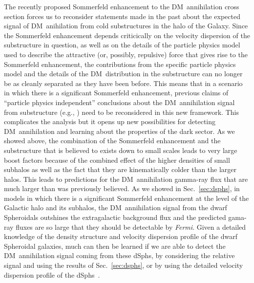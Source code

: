 \documentclass[aps,prd,twocolumn,amsmath,amssymb,floatfix,nofootinbib,10pt]{revtex4}
\newcommand{\eg}{e.g.}
\newcommand{\Fermi}{\emph{Fermi}}
\newcommand{\DM}{DM}
\newcommand{\dSphs}{dSphs}
\begin{document}
The recently proposed Sommerfeld enhancement to the \DM\ annihilation
cross section forces us to reconsider statements made in the past
about the expected signal of \DM\ anihilation from cold substructures
in the halo of the Galaxy. Since the Sommerfeld enhancement depends
criticically on the velocity dispersion of the substructure in
question, as well as on the details of the particle physics model used
to describe the attractive (or, possibly, repulsive) force that gives
rise to the Sommerfeld enhancement, the contributions from the
specific particle physics model and the details of the \DM\
distribution in the substructure can no longer be as cleanly separated
as they have been before. This means that in a scenario in which there
is a significant Sommerfeld enhancement, previous claims of ``particle
physics independent'' conclusions about the \DM\ annihilation signal
from substructure (\eg,
\cite{2007PhRvD..75h3526S,2008Natur.456...73S}) need to be
reconsidered in this new framework. This complicates the analysis but
it opens up new possibilities for detecting \DM\ annihilation and
learning about the properties of the dark sector. As we showed above,
the combination of the Sommerfeld enhancement and the substructure
that is believed to exists down to small scales leads to very large
boost factors because of the combined effect of the higher densities
of small subhalos as well as the fact that they are kinematically
colder than the larger halos. This leads to predictions for the \DM\
annihilation gamma-ray flux that are much larger than was previously
believed. As we showed in Sec.~\ref{sec:dsphs}, in models in which
there is a significant Sommerfeld enhancement at the level of the
Galactic halo and its subhalos, the \DM\ annihilation signal from the
dwarf Spheroidals outshines the extragalactic background flux and the
predicted gama-ray fluxes are so large that they should be detectable
by \Fermi. Given a detailed knowledge of the density structure and
velocity dispersion profile of the dwarf Spheroidal galaxies, much can
then be learned if we are able to detect the \DM\ annihilation signal
coming from these \dSphs, by considering the relative signal and using
the results of Sec.~\ref{sec:dsphs}, or by using the detailed velocity
dispersion profile of the \dSphs\ \cite{2009arXiv0902.0362R}.
\end{document}
